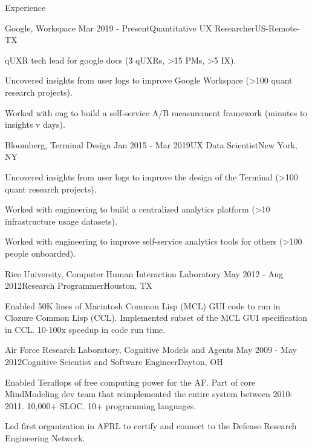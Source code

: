 
\begin{rSection}{Experience}

  \begin{rSubsection}{Google, Workspace}
    {Mar 2019 - Present}{Quantitative UX Researcher}{US-Remote-TX}
  \item qUXR tech lead for google docs (3 qUXRs, \textgreater15 PMs, \textgreater5 IX).
  \item Uncovered insights from user logs to improve Google Workspace (\textgreater100 quant research projects).
  \item Worked with eng to build a self-service A/B measurement framework (minutes to insights v days).
  \end{rSubsection}

  \begin{rSubsection}{Bloomberg, Terminal Design}
    {Jan 2015 - Mar 2019}{UX Data Scientist}{New York, NY}
    \item Uncovered insights from user logs to improve the design of the Terminal (\textgreater100 quant research projects).
    \item Worked with engineering to build a centralized analytics platform (\textgreater10 infrastructure usage datasets).
    \item Worked with engineering to improve self-service analytics tools for others (\textgreater100 people onboarded). 
  \end{rSubsection}

  \begin{rSubsection}{Rice University, Computer Human Interaction Laboratory}
    {May 2012 - Aug 2012}{Research Programmer}{Houston, TX}
  \item Enabled 50K lines of Macintosh Common Lisp (MCL) GUI code to run in Clozure Common Lisp (CCL).
    Implemented subset of the MCL GUI specification in CCL. 10-100x speedup in code run time. 
  \end{rSubsection}

  \begin{rSubsection}{Air Force Research Laboratory, Cognitive Models and Agents}
    {May 2009 - May 2012}{Cognitive Scientist and Software Engineer}{Dayton, OH}
  \item 
    Enabled Teraflops of free computing power for the AF.
    Part of core MindModeling dev team that reimplemented the entire system between 2010-2011.
    10,000+ SLOC. 10+ programming languages. 
  \item
    Led first organization in AFRL to certify and connect to the Defense Research Engineering Network.
  \end{rSubsection}


\end{rSection}

